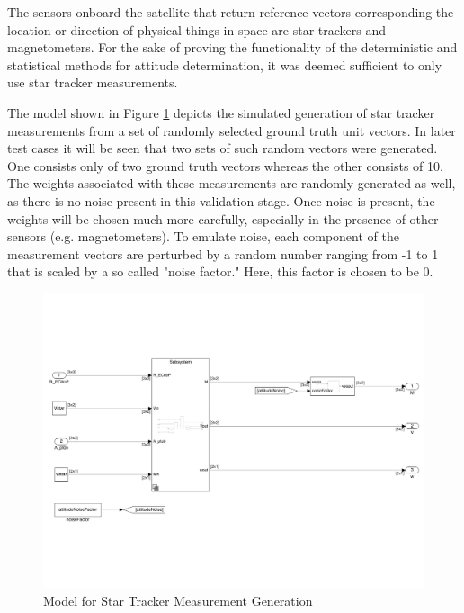 The sensors onboard the satellite that return reference vectors corresponding the location or direction of physical things in space are star trackers and magnetometers. For the sake of proving the functionality of the deterministic and statistical methods for attitude determination, it was deemed sufficient to only use star tracker measurements. 

The model shown in Figure \ref{fig:star_tracker_meas} depicts the simulated generation of star tracker measurements from a set of randomly selected ground truth unit vectors. In later test cases it will be seen that two sets of such random vectors were generated. One consists only of two ground truth vectors whereas the other consists of 10. The weights associated with these measurements are randomly generated as well, as there is no noise present in this validation stage. Once noise is present, the weights will be chosen much more carefully, especially in the presence of other sensors (e.g. magnetometers). To emulate noise, each component of the measurement vectors are perturbed by a random number ranging from -1 to 1 that is scaled by a so called "noise factor." Here, this factor is chosen to be 0.

\begin{figure}[H]
    \centering
    \captionsetup{ justification = centering }
    \includegraphics[trim={0.25cm 3cm 0.25cm 3cm},clip,width = 15cm]{Images/PS6/raw_meas_star.png}
    \caption{Model for Star Tracker Measurement Generation}
    \label{fig:star_tracker_meas}
\end{figure}


